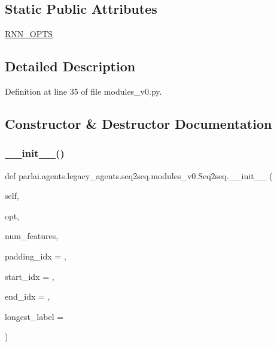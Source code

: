\subsection*{Static Public Attributes}
\begin{DoxyCompactItemize}
\item 
\hyperlink{classparlai_1_1agents_1_1legacy__agents_1_1seq2seq_1_1modules__v0_1_1Seq2seq_a92764ca883dc39a9c4187ab10a38255c}{R\+N\+N\+\_\+\+O\+P\+TS}
\end{DoxyCompactItemize}


\subsection{Detailed Description}


Definition at line 35 of file modules\+\_\+v0.\+py.



\subsection{Constructor \& Destructor Documentation}
\mbox{\label{classparlai_1_1agents_1_1legacy__agents_1_1seq2seq_1_1modules__v0_1_1Seq2seq_a18cac7233148ad9fd4e6a0ea290d4dbc}} 
\subsubsection{\texorpdfstring{\+\_\+\+\_\+init\+\_\+\+\_\+()}{\_\_init\_\_()}}
{\footnotesize\ttfamily def parlai.\+agents.\+legacy\+\_\+agents.\+seq2seq.\+modules\+\_\+v0.\+Seq2seq.\+\_\+\+\_\+init\+\_\+\+\_\+ (\begin{DoxyParamCaption}\item[{}]{self,  }\item[{}]{opt,  }\item[{}]{num\+\_\+features,  }\item[{}]{padding\+\_\+idx = {},  }\item[{}]{start\+\_\+idx = {},  }\item[{}]{end\+\_\+idx = {},  }\item[{}]{longest\+\_\+label = {} }\end{DoxyParamCaption})}



